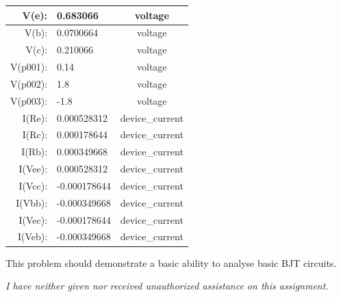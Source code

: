\documentclass[12pt,letterpaper,titlepage]{article}
\begin{document}
\begin{raggedright}
\begin{center}
\begin{paracol}{2}
\switchcolumn
\begin{tabular}{|r|l|c|}
  \hline V(e):	  & 0.683066	 & voltage
\\\hline V(b):	  & 0.0700664	 & voltage
\\\hline V(c):	  & 0.210066	 & voltage
\\\hline V(p001): & 0.14	     & voltage
\\\hline V(p002): & 1.8	         & voltage
\\\hline V(p003): & -1.8	     & voltage
\\\hline I(Re):	  & 0.000528312  & device\_current
\\\hline I(Rc):	  & 0.000178644  & device\_current
\\\hline I(Rb):	  & 0.000349668  & device\_current
\\\hline I(Vee):  & 0.000528312  & device\_current
\\\hline I(Vcc):  & -0.000178644 & device\_current
\\\hline I(Vbb):  & -0.000349668 & device\_current
\\\hline I(Vec):  & -0.000178644 & device\_current
\\\hline I(Veb):  & -0.000349668 & device\_current
\\\hline
\end{tabular}
\end{paracol}
\end{center}

This problem should demonstrate a basic ability to analyse basic BJT circuits. 

\textit{I have neither given nor received unauthorized assistance on this assignment.}


\end{raggedright}
\end{document}
